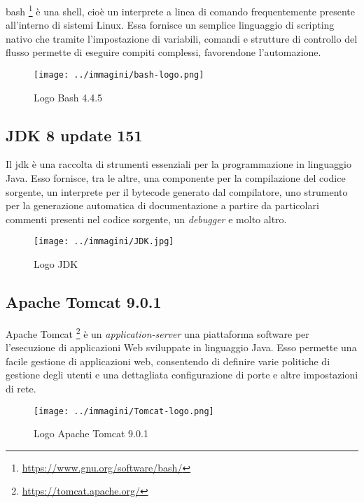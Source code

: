 \gls{bash} \footnote{\url{https://www.gnu.org/software/bash/}} è una shell, cioè un interprete a linea di comando frequentemente presente all'interno di sistemi \gls{Linux}. Essa fornisce un semplice linguaggio di scripting nativo che tramite l'impostazione di variabili, comandi e strutture di controllo del flusso permette di eseguire compiti complessi, favorendone l'automazione.

\begin{figure}[H]
    \capstart
    \centering
    \texttt{[image: ../immagini/bash-logo.png]}
    \caption{Logo Bash 4.4.5}
\end{figure}

\subsection{JDK 8 update 151}

Il \gls{jdk} è una raccolta di strumenti essenziali per la programmazione in linguaggio Java. Esso fornisce, tra le altre, una componente per la compilazione del codice sorgente, un interprete per il \gls{bytecode} generato dal compilatore, uno strumento per la generazione automatica di documentazione a partire da particolari commenti presenti nel codice sorgente, un \textit{\gls{debugger}} e molto altro.

\begin{figure}[H]
    \capstart
    \centering
    \texttt{[image: ../immagini/JDK.jpg]}
    \caption{Logo JDK}
\end{figure}

\subsection{Apache Tomcat 9.0.1}

Apache Tomcat \footnote{\url{https://tomcat.apache.org/}} è un \textit{\gls{application-server}} una piattaforma software per l'esecuzione di applicazioni Web sviluppate in linguaggio Java. Esso permette una facile gestione di applicazioni web, consentendo di definire varie politiche di gestione degli utenti e una dettagliata configurazione di porte e altre impostazioni di rete.

\begin{figure}[H]
    \capstart
    \centering
    \texttt{[image: ../immagini/Tomcat-logo.png]}
    \caption{Logo Apache Tomcat 9.0.1}
\end{figure}

